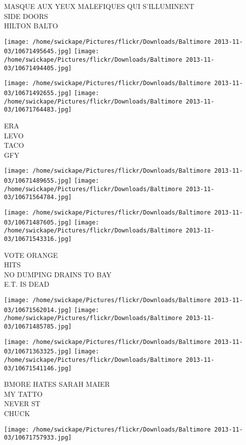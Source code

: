 \documentclass[10pt,letterpaper]{article}
\begin{document}
MASQUE AUX YEUX MALEFIQUES QUI S'ILLUMINENT\\
SIDE DOORS\\
HILTON BALTO
\pagebreak

\texttt{[image: /home/swickape/Pictures/flickr/Downloads/Baltimore 2013-11-03/10671495645.jpg]}
\texttt{[image: /home/swickape/Pictures/flickr/Downloads/Baltimore 2013-11-03/10671494405.jpg]}

\texttt{[image: /home/swickape/Pictures/flickr/Downloads/Baltimore 2013-11-03/10671492655.jpg]}
\texttt{[image: /home/swickape/Pictures/flickr/Downloads/Baltimore 2013-11-03/10671764483.jpg]}

ERA\\
LEVO\\
TACO\\
GFY
\pagebreak

\texttt{[image: /home/swickape/Pictures/flickr/Downloads/Baltimore 2013-11-03/10671489655.jpg]}
\texttt{[image: /home/swickape/Pictures/flickr/Downloads/Baltimore 2013-11-03/10671564784.jpg]}

\texttt{[image: /home/swickape/Pictures/flickr/Downloads/Baltimore 2013-11-03/10671487605.jpg]}
\texttt{[image: /home/swickape/Pictures/flickr/Downloads/Baltimore 2013-11-03/10671543316.jpg]}

VOTE ORANGE\\
HITS\\
NO DUMPING DRAINS TO BAY\\
E.T. IS DEAD
\pagebreak

\texttt{[image: /home/swickape/Pictures/flickr/Downloads/Baltimore 2013-11-03/10671562014.jpg]}
\texttt{[image: /home/swickape/Pictures/flickr/Downloads/Baltimore 2013-11-03/10671485785.jpg]}

\texttt{[image: /home/swickape/Pictures/flickr/Downloads/Baltimore 2013-11-03/10671363325.jpg]}
\texttt{[image: /home/swickape/Pictures/flickr/Downloads/Baltimore 2013-11-03/10671541146.jpg]}

BMORE HATES SARAH MAIER\\
MY TATTO\\
NEVER ST\\
CHUCK
\pagebreak

\texttt{[image: /home/swickape/Pictures/flickr/Downloads/Baltimore 2013-11-03/10671757933.jpg]}
\end{document}
